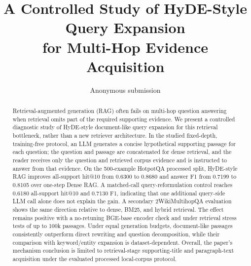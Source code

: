 \title{\textbf{A Controlled Study of HyDE-Style Query Expansion}\\
\textbf{for Multi-Hop Evidence Acquisition}}

\author{Anonymous submission}

\date{}

\maketitle

\begin{abstract}
Retrieval-augmented generation (RAG) often fails on multi-hop question answering when retrieval omits part of the required supporting evidence. We present a controlled diagnostic study of HyDE-style document-like query expansion for this retrieval bottleneck, rather than a new retriever architecture. In the studied fixed-depth, training-free protocol, an LLM generates a concise hypothetical supporting passage for each question; the question and passage are concatenated for dense retrieval, and the reader receives only the question and retrieved corpus evidence and is instructed to answer from that evidence. On the 500-example HotpotQA processed split, HyDE-style RAG improves all-support hit@10 from 0.6300 to 0.8680 and answer F1 from 0.7199 to 0.8105 over one-step Dense RAG. A matched-call query-reformulation control reaches 0.6180 all-support hit@10 and 0.7130 F1, indicating that one additional query-side LLM call alone does not explain the gain. A secondary 2WikiMultihopQA evaluation shows the same direction relative to dense, BM25, and hybrid retrieval. The effect remains positive with a no-retuning BGE-base encoder check and under retrieval stress tests of up to 100k passages. Under equal generation budgets, document-like passages consistently outperform direct rewriting and question decomposition, while their comparison with keyword/entity expansion is dataset-dependent. Overall, the paper's mechanism conclusion is limited to retrieval-stage supporting-title and paragraph-text acquisition under the evaluated processed local-corpus protocol.
\end{abstract}

